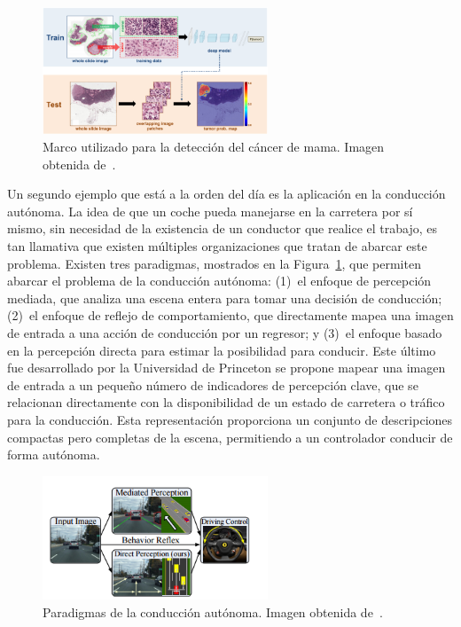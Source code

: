 \begin{figure}[H]
	\begin{center}
		\includegraphics[width=0.6\textwidth]{figures/cancer}
		\caption{Marco utilizado para la detección del cáncer de mama. Imagen obtenida de~\cite{2016arXiv160605718W}.}
	\end{center}
\end{figure}

Un segundo ejemplo que está a la orden del día es la aplicación en la conducción autónoma. La idea de que un coche pueda manejarse en la carretera por sí mismo, sin necesidad de la existencia de un conductor que realice el trabajo, es tan llamativa que existen múltiples organizaciones que tratan de abarcar este problema. Existen tres paradigmas, mostrados en la Figura~\ref{fig.conduccion}, que permiten abarcar el problema de la conducción autónoma: (1)~el enfoque de percepción mediada, que analiza una escena entera para tomar una decisión de conducción; (2)~el enfoque de reflejo de comportamiento, que directamente mapea una imagen de entrada a una acción de conducción por un regresor; y (3)~el enfoque basado en la percepción directa para estimar la posibilidad para conducir. Este último fue desarrollado por la Universidad de Princeton se propone mapear una imagen de entrada a un pequeño número de indicadores de percepción clave, que se relacionan directamente con la disponibilidad de un estado de carretera o tráfico para la conducción. Esta representación proporciona un conjunto de descripciones compactas pero completas de la escena, permitiendo a un controlador conducir de forma autónoma.

\begin{figure}[H]
	\begin{center}
		\includegraphics[width=0.6\textwidth]{figures/conduccion}
		\caption{Paradigmas de la conducción autónoma. Imagen obtenida de~\cite{2015arXiv150500256C}.}
		\label{fig.conduccion}
	\end{center}
\end{figure}

